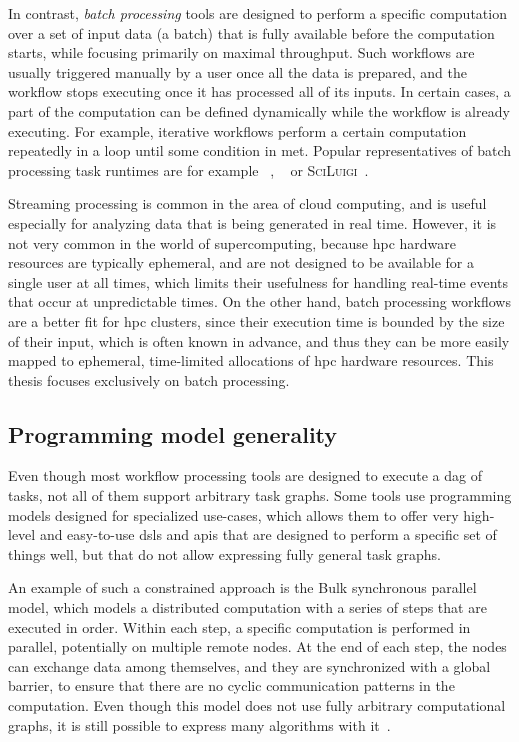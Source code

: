 In contrast, \emph{batch processing} tools are designed to perform a specific computation over a
set of input data (a batch) that is fully available before the computation starts, while focusing
primarily on maximal throughput. Such workflows are usually triggered manually by a user once all
the data is prepared, and the workflow stops executing once it has processed all of its inputs. In
certain cases, a part of the computation can be defined dynamically while the workflow is already
executing. For example, iterative workflows perform a certain computation repeatedly in a loop
until some condition in met. Popular representatives of batch processing task runtimes are for
example \dask{}~\cite{dask},
\snakemake{}~\cite{snakemake} or \textsc{SciLuigi}~\cite{sciluigi}.

Streaming processing is common in the area of cloud computing, and is useful especially for
analyzing data that is being generated in real time. However, it is not very common in the world of
supercomputing, because \gls{hpc} hardware resources are typically ephemeral, and are
not designed to be available for a single user at all times, which limits their usefulness for
handling real-time events that occur at unpredictable times. On the other hand, batch processing
workflows are a better fit for \gls{hpc} clusters, since their execution time is
bounded by the size of their input, which is often known in advance, and thus they can be more
easily mapped to ephemeral, time-limited allocations of \gls{hpc} hardware resources.
This thesis focuses exclusively on batch processing.

\subsection{Programming model generality}
Even though most workflow processing tools are designed to execute a \gls{dag} of
tasks, not all of them support arbitrary task graphs. Some tools use programming models designed
for specialized use-cases, which allows them to offer very high-level and easy-to-use
\glspl{dsl} and \glspl{api} that are designed to perform a specific set of
things well, but that do not allow expressing fully general task graphs.

An example of such a constrained approach is the Bulk synchronous parallel~\cite{bulkparallel1}
model, which models a distributed computation with a series of steps that are executed in order.
Within each step, a specific computation is performed in parallel, potentially on multiple remote
nodes. At the end of each step, the nodes can exchange data among themselves, and they are
synchronized with a global barrier, to ensure that there are no cyclic communication patterns in
the computation. Even though this model does not use fully arbitrary computational graphs, it is
still possible to express many algorithms with it~\cite{bulkparallel2}.

